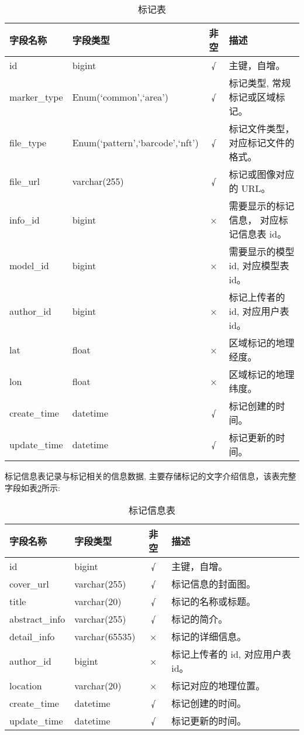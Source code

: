 \begin{table}[H]
  \centering
  \small
  \caption{标记表}
  \label{table:标记表}
  \setlength{\tabcolsep}{3.7mm}
  \begin{tabular}{l|l|c|l}
    \toprule
    \textbf{字段名称} & \textbf{字段类型} & \textbf{非空} & \textbf{描述} \\
    \midrule
    id & bigint & √ & 主键，自增。 \\
    marker\_type & Enum(`common',`area') & √ & 标记类型, 常规标记或区域标记。 \\
    file\_type & Enum(`pattern',`barcode',`nft') & √ & 标记文件类型，对应标记文件的格式。 \\
    file\_url & varchar(255) & √ & 标记或图像对应的 URL。 \\
    info\_id & bigint & × & 需要显示的标记信息， 对应标记信息表 id。 \\
    model\_id & bigint & × & 需要显示的模型 id, 对应模型表 id。 \\
    author\_id & bigint & × & 标记上传者的 id, 对应用户表 id。 \\
    lat & float & × & 区域标记的地理经度。\\
    lon & float & × & 区域标记的地理纬度。\\
    create\_time & datetime & √ & 标记创建的时间。 \\
    update\_time & datetime & √ & 标记更新的时间。 \\
    \bottomrule
  \end{tabular}
\end{table}

标记信息表记录与标记相关的信息数据, 主要存储标记的文字介绍信息，该表完整字段如表\ref{table:标记信息表}所示:

\begin{table}[H]
  \centering
  \small
  \caption{标记信息表}
  \label{table:标记信息表}
  \setlength{\tabcolsep}{8mm}
  \begin{tabular}{l|l|c|l}
    \toprule
    \textbf{字段名称} & \textbf{字段类型} & \textbf{非空} & \textbf{描述} \\
    \midrule
    id & bigint & √ & 主键，自增。 \\
    cover\_url & varchar(255) & √ & 标记信息的封面图。 \\
    title & varchar(20) & √ & 标记的名称或标题。 \\
    abstract\_info& varchar(255) & √ & 标记的简介。 \\
    detail\_info & varchar(65535) & × & 标记的详细信息。 \\
    author\_id & bigint & × & 标记上传者的 id, 对应用户表 id。 \\
    location & varchar(20) & × & 标记对应的地理位置。 \\
    create\_time & datetime & √ & 标记创建的时间。 \\
    update\_time & datetime & √ & 标记更新的时间。 \\
    \bottomrule
  \end{tabular}
\end{table}

